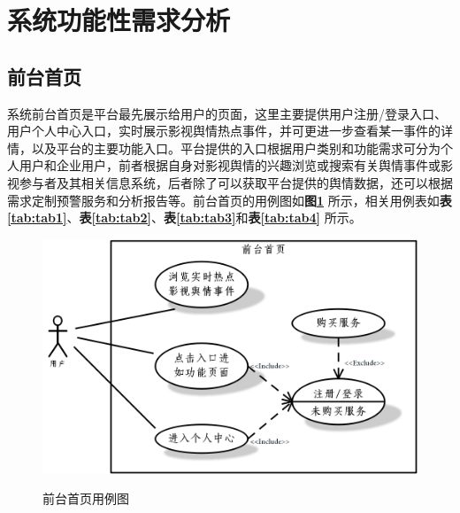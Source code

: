 \section{系统功能性需求分析}
\subsection{前台首页}

系统前台首页是平台最先展示给用户的页面，这里主要提供用户注册/登录入口、用户个人中心入口，实时展示影视舆情热点事件，并可更进一步查看某一事件的详情，以及平台的主要功能入口。平台提供的入口根据用户类别和功能需求可分为个人用户和企业用户，前者根据自身对影视舆情的兴趣浏览或搜索有关舆情事件或影视参与者及其相关信息系统，后者除了可以获取平台提供的舆情数据，还可以根据需求定制预警服务和分析报告等。前台首页的用例图如\textbf{图\ref{fig:fig1}} 所示，相关用例表如\textbf{表\ref{tab:tab1}}、\textbf{表\ref{tab:tab2}}、\textbf{表\ref{tab:tab3}}和\textbf{表\ref{tab:tab4}} 所示。

\begin{figure}[!htb]
	\centering\label{fig:fig1}
	\includegraphics[scale=0.6]{image/f1.png}
	\caption{前台首页用例图}
\end{figure}



